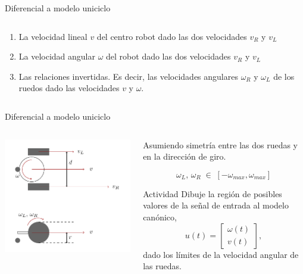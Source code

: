 \documentclass[presentation,aspectratio=169]{beamer}
\begin{document}
\begin{frame}[label={sec:orgee79b36}]{Diferencial a modelo uniciclo}
\begin{columns}
\begin{column}{0.6\columnwidth}
\begin{enumerate}
\item La velocidad lineal \(v\) del centro robot dado las dos velocidades \(v_R\) y \(v_L\)

\item La velocidad angular \(\omega\) del robot dado las dos velocidades \(v_R\) y \(v_L\)

\item Las relaciones invertidas. Es decir, las velocidades angulares \(\omega_R\) y \(\omega_L\) de los ruedos dado las velocidades \(v\) y \(\omega\).
\end{enumerate}
\end{column}
\end{columns}
\end{frame}


\begin{frame}[label={sec:orgbc5cbd4}]{Diferencial a modelo uniciclo}
\begin{columns}
\begin{column}{0.4\columnwidth}
\begin{center}
 \includegraphics[width=.8\linewidth]{../figures/unicycle-model-details}
\end{center}
\end{column}

\begin{column}{0.6\columnwidth}
Asumiendo simetría entre las dos ruedas y en la dirección de giro.

\[ \omega_L,\, \omega_R \; \in \; [-\omega_{max}, \omega_{max}]\]

\pause

\alert{Actividad}
Dibuje la región de posibles valores de la señal de entrada al modelo canónico,
\[ u(t) = \begin{bmatrix} \omega(t)\\v(t) \end{bmatrix}, \]
dado los límites de la velocidad angular de las ruedas.
\end{column}
\end{columns}
\end{frame}
\end{document}
